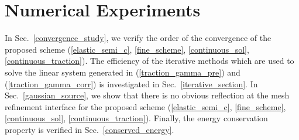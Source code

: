 \section{Numerical Experiments}
 In Sec.~\ref{convergence_study}, we verify the order of the convergence of the proposed scheme (\ref{elastic_semi_c}, \ref{fine_scheme}, \ref{continuous_sol}, \ref{continuous_traction}). The efficiency of the iterative methods which are used to solve the linear system generated in (\ref{traction_gamma_pre}) and (\ref{traction_gamma_corr}) is investigated in Sec.~\ref{iterative_section}. In Sec.~\ref{gaussian_source}, we show that there is no obvious reflection at the mesh refinement interface for the proposed scheme (\ref{elastic_semi_c}, \ref{fine_scheme}, \ref{continuous_sol}, \ref{continuous_traction}). Finally, the energy conservation property is verified in Sec.~\ref{conserved_energy}.